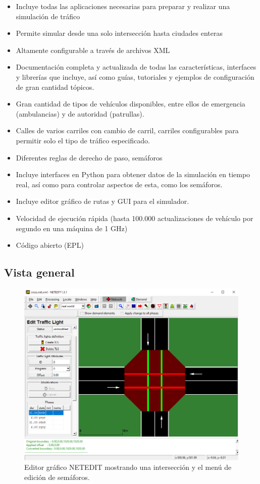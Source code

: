 \begin{itemize}
\tightlist
\item
  Incluye todas las aplicaciones necesarias para preparar y realizar una
  simulación de tráfico
\item
  Permite simular desde una solo intersección hasta ciudades enteras
\item
  Altamente configurable a través de archivos XML
\item
  Documentación completa y actualizada de todas las características,
  interfaces y librerías que incluye, así como guías, tutoriales y
  ejemplos de configuración de gran cantidad tópicos.
\item
  Gran cantidad de tipos de vehículos disponibles, entre ellos de
  emergencia (ambulancias) y de autoridad (patrullas).
\item
  Calles de varios carriles con cambio de carril, carriles configurables
  para permitir solo el tipo de tráfico especificado.
\item
  Diferentes reglas de derecho de paso, semáforos
\item
  Incluye interfaces en Python para obtener datos de la simulación en
  tiempo real, así como para controlar aspectos de esta, como los
  semáforos.
\item
  Incluye editor gráfico de rutas y GUI para el simulador.
\item
  Velocidad de ejecución rápida (hasta 100.000 actualizaciones de
  vehículo por segundo en una máquina de 1 GHz)
\item
  Código abierto (EPL)
\end{itemize}

\hypertarget{vista-general}{%
\subsection{Vista general}\label{vista-general}}

\begin{figure}[H]
    \centering
    \includegraphics[width=\textwidth]{sumo/1cb8aa292f0be15b402ccd4f098f53e0.png}
    \caption{Editor gráfico NETEDIT mostrando una intersección y el menú de edición de semáforos.}
    \label{fig:netedit1}
\end{figure}

